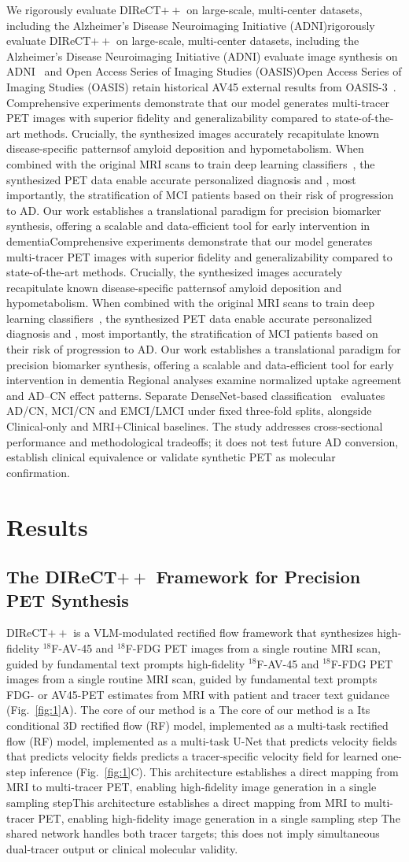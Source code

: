 \documentclass{article}
\providecommand{\DIFaddtex}[1]{{\protect\color{blue} \sf #1}} %
\providecommand{\DIFdeltex}[1]{{\protect\color{red} \ifmmode #1\else\scriptsize #1\fi}} %
\providecommand{\DIFaddbegin}{} %
\providecommand{\DIFaddend}{} %
\providecommand{\DIFdelbegin}{} %
\providecommand{\DIFdelend}{} %
\providecommand{\DIFadd}[1]{\texorpdfstring{\DIFaddtex{#1}}{#1}} %
\providecommand{\DIFdel}[1]{\texorpdfstring{\DIFdeltex{#1}}{}} %
\newcommand{\DIFscaledelfig}{0.5}
\newlength{\DIFdelgraphicswidth} %
\newlength{\DIFdelgraphicsheight} %
\newcommand{\DIFaddincludegraphics}[2][]{{\color{blue}\fbox{\DIFOincludegraphics[#1]{#2}}}} %
\newcommand{\DIFdelincludegraphics}[2][]{%
\sbox{\DIFdelgraphicsbox}{\DIFOincludegraphics[#1]{#2}}%
\settoboxwidth{\DIFdelgraphicswidth}{\DIFdelgraphicsbox} %
\settoboxtotalheight{\DIFdelgraphicsheight}{\DIFdelgraphicsbox} %
\scalebox{\DIFscaledelfig}{%
\parbox[b]{\DIFdelgraphicswidth}{\usebox{\DIFdelgraphicsbox}\\[-\baselineskip] \rule{\DIFdelgraphicswidth}{0em}}\llap{\resizebox{\DIFdelgraphicswidth}{\DIFdelgraphicsheight}{%
\setlength{\unitlength}{\DIFdelgraphicswidth}%
\begin{picture}(1,1)%
\thicklines\linethickness{2pt} %
{\color[rgb]{1,0,0}\put(0,0){\framebox(1,1){}}}%
{\color[rgb]{1,0,0}\put(0,0){\line( 1,1){1}}}%
{\color[rgb]{1,0,0}\put(0,1){\line(1,-1){1}}}%
\end{picture}%
}\hspace*{3pt}}} %
} %
\DeclareRobustCommand{\DIFaddbegin}{\DIFOaddbegin \let\includegraphics\DIFaddincludegraphics} %
\DeclareRobustCommand{\DIFaddend}{\DIFOaddend \let\includegraphics\DIFOincludegraphics} %
\DeclareRobustCommand{\DIFdelbegin}{\DIFOdelbegin \let\includegraphics\DIFdelincludegraphics} %
\DeclareRobustCommand{\DIFdelend}{\DIFOaddend \let\includegraphics\DIFOincludegraphics} %
\begin{document}
We \DIFdelbegin \DIFdel{rigorously evaluate DIReCT$++$ on large-scale, multi-center datasets, including the Alzheimer's Disease Neuroimaging Initiative (ADNI)}\DIFdelend \DIFaddbegin \DIFadd{evaluate image synthesis on ADNI}\DIFaddend ~\cite{weiner2010alzheimer} and \DIFdelbegin \DIFdel{Open Access Series of Imaging Studies (OASIS)}\DIFdelend \DIFaddbegin \DIFadd{retain historical AV45 external results from OASIS-3}\DIFaddend ~\cite{lamontagne2019oasis}. \DIFdelbegin \DIFdel{Comprehensive experiments demonstrate that our model generates multi-tracer PET images with superior fidelity and generalizability compared to state-of-the-art methods. Crucially, the synthesized images accurately recapitulate known disease-specific patternsof amyloid deposition and hypometabolism. When combined with the original MRI scans to train deep learning classifiers~\cite{lian2018hierarchical,huang2017densely}, the synthesized PET data enable accurate personalized diagnosis and , most importantly, the stratification of MCI patients based on their risk of progression to AD. Our work establishes a translational paradigm for precision biomarker synthesis, offering a scalable and data-efficient tool for early intervention in dementia}\DIFdelend \DIFaddbegin \DIFadd{Regional analyses examine normalized uptake agreement and AD--CN effect patterns. Separate DenseNet-based classification~\cite{huang2017densely} evaluates AD/CN, MCI/CN and EMCI/LMCI under fixed three-fold splits, alongside Clinical-only and MRI+Clinical baselines. The study addresses cross-sectional performance and methodological tradeoffs; it does not test future AD conversion, establish clinical equivalence or validate synthetic PET as molecular confirmation}\DIFaddend .


\section{Results}
\subsection{The \texorpdfstring{DIReCT$++$}{DIReCT++} Framework for Precision PET Synthesis}
DIReCT$++$ is a VLM-modulated rectified flow framework that synthesizes \DIFdelbegin \DIFdel{high-fidelity $^{18}$F-AV-45 and $^{18}$F-FDG PET images from a single routine MRI scan, guided by fundamental text prompts }\DIFdelend \DIFaddbegin \DIFadd{FDG- or AV45-PET estimates from MRI with patient and tracer text guidance }\DIFaddend (Fig.~\ref{fig:1}A). \DIFdelbegin \DIFdel{The core of our method is a }\DIFdelend \DIFaddbegin \DIFadd{Its }\DIFaddend conditional 3D \DIFdelbegin \DIFdel{rectified flow (RF) model, implemented as a multi-task }\DIFdelend U-Net \DIFdelbegin \DIFdel{that predicts velocity fields }\DIFdelend \DIFaddbegin \DIFadd{predicts a tracer-specific velocity field for learned one-step inference }\DIFaddend (Fig.~\ref{fig:1}C). \DIFdelbegin \DIFdel{This architecture establishes a direct mapping from MRI to multi-tracer PET, enabling high-fidelity image generation in a single sampling step}\DIFdelend \DIFaddbegin \DIFadd{The shared network handles both tracer targets; this does not imply simultaneous dual-tracer output or clinical molecular validity}\DIFaddend .
\end{document}
